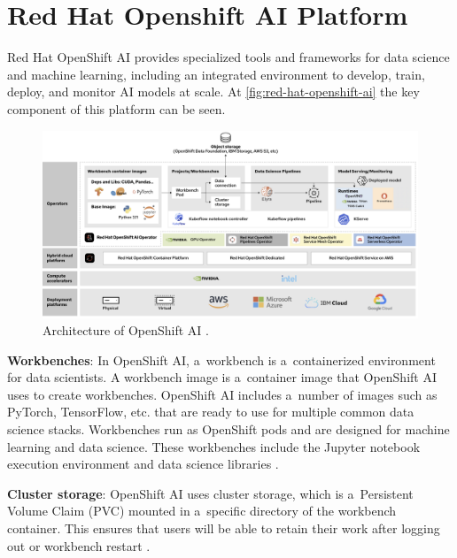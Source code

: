 
\section*{Red Hat Openshift AI Platform}

Red Hat OpenShift AI provides specialized tools and frameworks for data science and machine learning, including an integrated environment to develop, train, deploy, and monitor AI models at scale. At \autoref{fig:red-hat-openshift-ai} the key component of this platform can be seen.


\begin{figure}[htbp]
    \centering
    \includegraphics[width=\linewidth]{obrazky-figures/02-theoretical-basis/openshift_ai.png}
    \caption{Architecture of OpenShift AI \cite{Midha2024}.}
    \label{fig:red-hat-openshift-ai}
\end{figure}


\textbf{Workbenches}:
In OpenShift AI, a~workbench is a~containerized environment for data scientists. A workbench image is a~container image that OpenShift AI uses to create workbenches. OpenShift AI includes a~number of images such as PyTorch, TensorFlow, etc. that are ready to use for multiple common data science stacks. Workbenches run as OpenShift pods and are designed for machine learning and data science. These workbenches include the Jupyter notebook execution environment and data science libraries \cite{Midha2024}.

\medskip

\textbf{Cluster storage}:
OpenShift AI uses cluster storage, which is a~Persistent Volume Claim (PVC) mounted in a~specific directory of the workbench container. This ensures that users will be able to retain their work after logging out or workbench restart \cite{Midha2024}.

